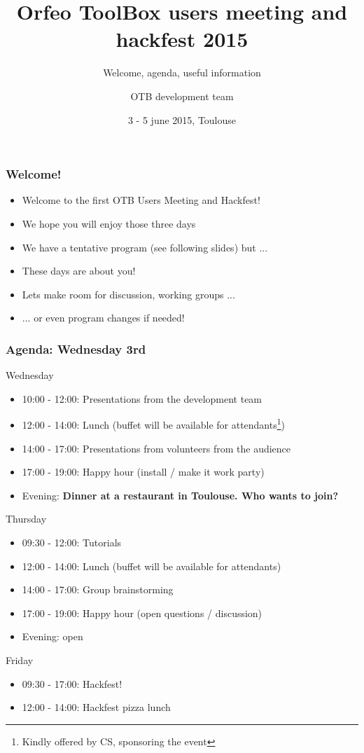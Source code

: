 \documentclass[8pt]{beamer}
\title{Orfeo ToolBox users meeting and hackfest 2015}
\subtitle{Welcome, agenda, useful information}
\author{OTB development team}%
\date{3 - 5 june 2015, Toulouse}
\begin{document}
\begin{frame}
\titlepage
\end{frame}

\begin{frame}
\frametitle{Welcome!}
\begin{itemize}
\item Welcome to the first OTB Users Meeting and Hackfest!
\item We hope you will enjoy those three days
\item We have a tentative program (see following slides) but ...
\item These days are about you!
\item Lets make room for discussion, working groups ...
\item ... or even program changes if needed!
\end{itemize}
\end{frame}

\begin{frame}
\frametitle{Agenda: Wednesday 3rd}

\begin{block}{Wednesday}
\begin{itemize}
\item 10:00 - 12:00: Presentations from the development team
\item 12:00 - 14:00: Lunch (buffet will be available for attendants\footnote{Kindly offered by CS, sponsoring the event})
\item 14:00 - 17:00: Presentations from volunteers from the audience 
\item 17:00 - 19:00: Happy hour (install / make it work party)
\item Evening: \textbf{Dinner at a restaurant in Toulouse. Who wants to join?}
\end{itemize}
\end{block}

\begin{block}{Thursday}
\begin{itemize}
\item 09:30 - 12:00: Tutorials
\item 12:00 - 14:00: Lunch (buffet will be available for attendants)
\item 14:00 - 17:00: Group brainstorming 
\item 17:00 - 19:00: Happy hour (open questions / discussion)
\item Evening: open
\end{itemize}
\end{block}

\begin{block}{Friday}
\begin{itemize}
\item 09:30 - 17:00: Hackfest!
\item 12:00 - 14:00: Hackfest pizza lunch
\end{itemize}
\end{block}
\end{frame}
\end{document}

